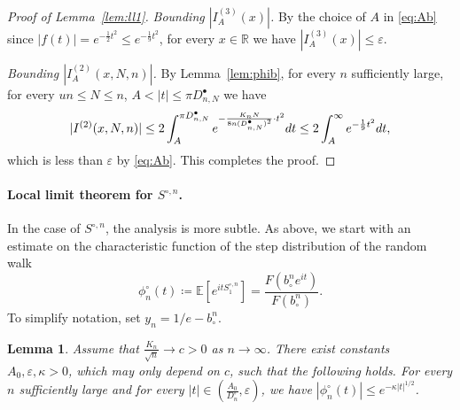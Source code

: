 \documentclass[11pt]{article}
\newtheorem{lemma}[theo]{Lemma}
\theoremstyle{definition}
\numberwithin{equation}{section}
\numberwithin{figure}{section}
\numberwithin{table}{section}
\newcommand{\R}{\mathbb{R}}
\def\d{{\rm d}}
\def\bcn{b_{\circ}^{n}}
\def\Scn{S^{\circ,n}}
\def\phicn{\phi^{\circ}_{n}}
\def\DbnN{D^{\bullet}_{n,N}}
\def\Dcn{D^{\circ}_{n}}
\renewcommand{\epsilon}{\varepsilon}
\newcommand\Es[1]{\mathbb{E}\left[#1\right]}
\begin{document}
\begin{proof}[Proof of Lemma~\ref{lem:ll1}]
\emph{Bounding $|I^{(3)}_{A}(x)|$.} By the choice of $A$ in \eqref{eq:Ab}
since $|f(t)|=e^{-  \frac{1}{2} t^{2}} \le e^{-  \frac{1}{9} t^{2}}$,
for every $x \in \R$ we have $|I^{(3)}_{A}(x)| \leq \epsilon$.


 \emph{Bounding $|I^{(2)}_{{A} }(x,N,n)|$.}  By Lemma~\ref{lem:phib},  for every $n$ sufficiently large, for every $ un \leq N \leq n$, $A<|t| \leq \pi  \DbnN$ we have
\[|I^{(2)}(x,N,n)| \leq 2 \int_{A}^{\pi \DbnN} e^{-  \frac{ K_{n} N }{ 8 n (\DbnN)^{2}} \cdot t^{2} } {\d}t \leq 2 \int_{A}^{\infty } e^{-  \frac{1}{9} t^{2}} {\d}t,\]
   which is less than $\epsilon$ by \eqref{eq:Ab}. This completes the proof.
\end{proof}





\paragraph*{Local limit theorem for $\Scn$.}

In the case of $\Scn$, the analysis is more subtle.
As above, we start with an estimate on the characteristic function
of the step distribution of the random walk
\[\phicn(t)\coloneqq\Es{e^{it\Scn_{1}}}=\frac{F( \bcn e^{it})}{F(\bcn)}.\]
To simplify notation, set  $y_{n}=1/e-\bcn$.

\begin{lemma}\label{lem:technique}
Assume that $\tfrac{K_{n}}{\sqrt{n}} \rightarrow c>0$ as $n \rightarrow \infty$.  There exist constants $A_{0},\epsilon,\kappa>0$, which may only depend on $c$, such that the following holds.
For every $n$ sufficiently large and for every $|t| \in (\frac{A_{0}}{\Dcn},\epsilon)$, we have $|\phicn(t)| \leq e^{- \kappa |t|^{1/2}}$.
\end{lemma}
\end{document}
